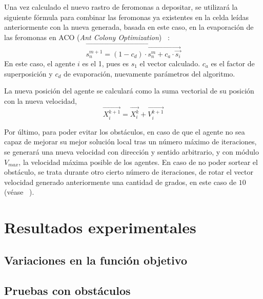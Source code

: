 \documentclass[runningheads]{llncs}
\begin{document}
    Una vez calculado el nuevo rastro de feromonas a depositar, se utilizará la siguiente fórmula para combinar las feromonas ya existentes en la celda leídas anteriormente con la nueva generada, basada en este caso, en la evaporación de las feromonas en ACO (\textit{Ant Colony Optimization}) ~\cite{ACO}:
    \[
        \vec{s_n^{m+1}=(1-c_d)\cdot\vec{s_n^m+c_a\cdot\vec{s_i}}}
    \]
    En este caso, el agente $i$ es el 1, pues es $s_1$ el vector calculado. $c_a$ es el factor de superposición y $c_d$ de evaporación, nuevamente parámetros del algoritmo.

    La nueva posición del agente se calculará como la suma vectorial de su posición con la nueva velocidad,
    \[  \vec{ X_i^{k+1} } = \vec{X_i^k} + \vec{ V_i^{k+1} }  \]

    Por último, para poder evitar los obstáculos, en caso de que el agente no sea capaz de mejorar su mejor solución local tras un número máximo de iteraciones, se generará una nueva velocidad con dirección y sentido arbitrario, y con módulo $V_{max}$, la velocidad máxima posible de los agentes. En caso de no poder sortear el obstáculo, se trata durante otro cierto número de iteraciones, de rotar el vector velocidad generado anteriormente una cantidad de grados, en este caso de $10$ (véase ~\cite{referencedPaper}).


    \section{Resultados experimentales}



    \subsection{Variaciones en la función objetivo}


    \subsection{Pruebas con obstáculos}
\end{document}
